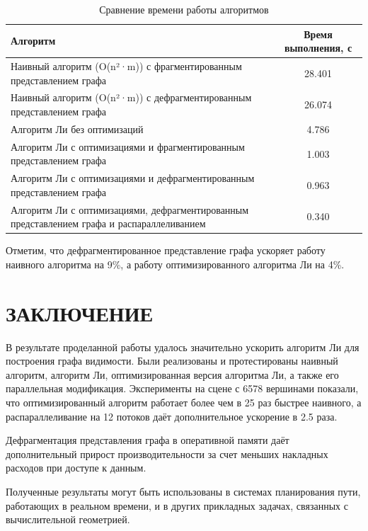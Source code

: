 \documentclass[intlimits,twoside,a4paper,11pt]{article}
\theoremstyle{definition}
\begin{document}
\begin{table}[H]
    \centering
    \caption{Сравнение времени работы алгоритмов}
    \label{tab:results}
    \small
    \begin{tabular}{|p{9cm}|c|}
        \hline
        \textbf{Алгоритм} & \textbf{Время выполнения, с} \\
        \hline
        Наивный алгоритм (O(n²·m)) с фрагментированным представлением графа & 28.401 \\
        \hline
        Наивный алгоритм (O(n²·m)) с дефрагментированным представлением графа  & 26.074 \\
        \hline
        Алгоритм Ли без оптимизаций & 4.786 \\
        \hline
        Алгоритм Ли с оптимизациями и фрагментированным представлением графа & 1.003 \\
        \hline
        Алгоритм Ли с оптимизациями и дефрагментированным представлением графа & 0.963 \\
        \hline
        Алгоритм Ли с оптимизациями, дефрагментированным представлением графа и распараллеливанием & 0.340 \\
        \hline
    \end{tabular}
\end{table}

Отметим, что дефрагментированное представление графа ускоряет работу наивного алгоритма на 9\%,
а работу оптимизированного алгоритма Ли на 4\%.

\section*{ЗАКЛЮЧЕНИЕ}

В результате проделанной работы удалось значительно ускорить алгоритм Ли для построения графа видимости.
Были реализованы и протестированы наивный алгоритм, алгоритм Ли, оптимизированная версия алгоритма Ли, а также его параллельная модификация.
Эксперименты на сцене с 6578 вершинами показали, что оптимизированный алгоритм работает более чем в 25 раз быстрее наивного,
а распараллеливание на 12 потоков даёт дополнительное ускорение в 2.5 раза.

Дефрагментация представления графа в оперативной памяти даёт дополнительный прирост производительности 
за счет меньших накладных расходов при доступе к данным.

Полученные результаты могут быть использованы в системах планирования пути, работающих в реальном времени,
и в других прикладных задачах, связанных с вычислительной геометрией.
\end{document}

